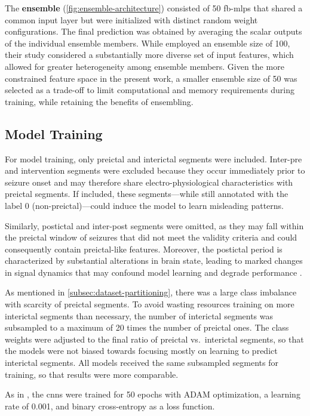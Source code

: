 The \textbf{ensemble} (\cref{fig:ensemble-architecture}) consisted of 50 \glspl{fb-mlp} that shared a common input layer but were initialized with distinct random weight configurations.
The final prediction was obtained by averaging the scalar outputs of the individual ensemble members.
While \textcite{muller_coherent_2022} employed an ensemble size of 100, their study considered
 a substantially more diverse set of input features, which allowed for greater heterogeneity among ensemble members.
Given the more constrained feature space in the present work, a smaller ensemble size of 50 was selected as a trade-off to limit computational and memory requirements during training, while retaining the benefits of ensembling.


\subsection{Model Training} \label{subsec:model-training}
For model training, only preictal and interictal segments were included. 
Inter-pre and intervention segments were excluded because they occur immediately prior to seizure onset and may therefore share electro-physiological characteristics with preictal segments. 
If included, these segments—while still annotated with the label 0 (non-preictal)—could induce the model to learn misleading patterns.

Similarly, postictal and inter-post segments were omitted, as they may fall within the preictal window of seizures that did not meet the validity criteria and could consequently contain preictal-like features. 
Moreover, the postictal period is characterized by substantial alterations in brain state, leading to marked changes in signal dynamics that may confound model learning and degrade performance \parencite{muller_coherent_2022}.

As mentioned in \cref{subsec:dataset-partitioning}, there was a large class imbalance with scarcity of preictal segments.
To avoid wasting resources training on more interictal segments than necessary, the number of interictal segments was subsampled to a maximum of 20 times the number of preictal ones.
The class weights were adjusted to the final ratio of preictal vs.\ interictal segments, so that the models were not biased towards focusing mostly on learning to predict interictal segments.
All models received the same subsampled segments for training, so that results were more comparable.

As in \textcite{eberlein_convolutional_2018}, the \glspl{cnn} were trained for 50 epochs with ADAM optimization, a learning rate of \num{0.001}, and binary cross-entropy as a loss function.

